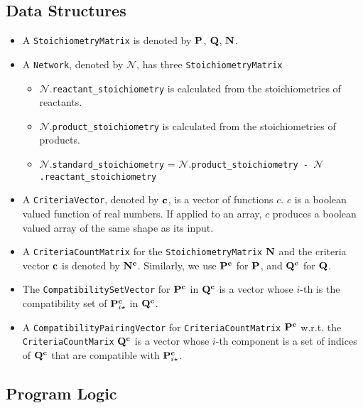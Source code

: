 \documentclass{article}
\newcommand{\mat}[1]{${\bf #1}$} %
\newcommand{\cmat}[1]{${\bf #1}^{\bf c}$} %
\newcommand{\crow}[2]{${\bf #1}^{\bf c}_{#2 \star}$}  %
\begin{document}
\subsection{Data Structures}
\begin{itemize}
    \item A {\tt StoichiometryMatrix} is denoted by \mat{P}, \mat{Q}, \mat{N}.
    
    \item A {\tt Network}, denoted by $\mathcal{N}$, has three {\tt StoichiometryMatrix}
    \begin{itemize}
        \item $\mathcal{N}$.{\tt reactant\_stoichiometry} is calculated from the stoichiometries of reactants.
        \item $\mathcal{N}$.{\tt product\_stoichiometry} is calculated from the stoichiometries of products.
         \item $\mathcal{N}$.{\tt standard\_stoichiometry} = $\mathcal{N}$.{\tt product\_stoichiometry - $\mathcal{N}$.reactant\_stoichiometry}
    \end{itemize}
    
    \item A {\tt CriteriaVector}, denoted by \mat{c}, is a vector of functions $c$. $c$ is a boolean valued function of real numbers. If applied to an array, $c$ produces a boolean valued array of the same shape as its input.
    
    \item A {\tt CriteriaCountMatrix} for the {\tt StoichiometryMatrix} \mat{N} and the criteria vector \mat{c} is denoted by \cmat{N}. Similarly, we use \cmat{P} for \mat{P}, and \cmat{Q} for \mat{Q}.
    
    \item The {\tt CompatibilitySetVector} for \cmat{P} in \cmat{Q} is a vector whose $i$-th is the compatibility set of \crow{P}{i} in \cmat{Q}.
    
    \item A {\tt CompatibilityPairingVector}
    for {\tt CriteriaCountMatrix} \cmat{P} w.r.t. the {\tt CriteriaCountMarix} \cmat{Q} is a vector whose $i$-th component is a set of indices of \cmat{Q} that are compatible with
    \crow{P}{i}.
\end{itemize}

\subsection{Program Logic}
\end{document}
